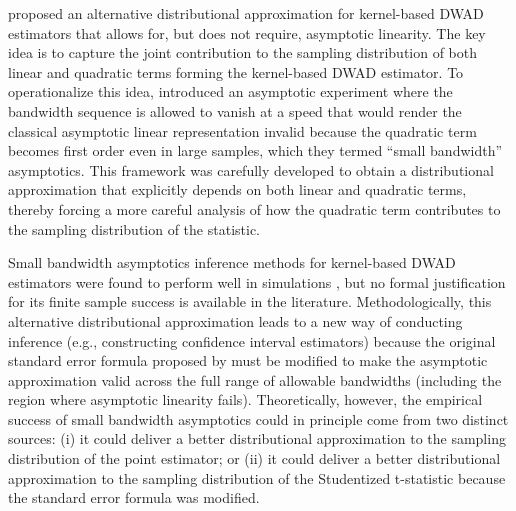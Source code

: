 \documentclass[11pt]{article}
\numberwithin{equation}{section}
\theoremstyle{definition}
\begin{document}
\citet{Cattaneo-Crump-Jansson_2014a_ET} proposed an alternative distributional approximation for kernel-based DWAD estimators that allows for, but does not require, asymptotic linearity. The key idea is to capture the joint contribution to the sampling distribution of both linear and quadratic terms forming the kernel-based DWAD estimator. To operationalize this idea, \citet{Cattaneo-Crump-Jansson_2014a_ET} introduced an asymptotic experiment where the bandwidth sequence is allowed to vanish at a speed that would render the classical asymptotic linear representation invalid because the quadratic term becomes first order even in large samples, which they termed ``small bandwidth'' asymptotics. This framework was carefully developed to obtain a distributional approximation that explicitly depends on both linear and quadratic terms, thereby forcing a more careful analysis of how the quadratic term contributes to the sampling distribution of the statistic.

Small bandwidth asymptotics inference methods for kernel-based DWAD estimators were found to perform well in simulations \citep{Cattaneo-Crump-Jansson_2010_JASA,Cattaneo-Crump-Jansson_2014a_ET,Cattaneo-Crump-Jansson_2014b_ET}, but no formal justification for its finite sample success is available in the literature. Methodologically, this alternative distributional approximation leads to a new way of conducting inference (e.g., constructing confidence interval estimators) because the original standard error formula proposed by \citet{Powell-Stock-Stoker_1989_ECMA} must be modified to make the asymptotic approximation valid across the full range of allowable bandwidths (including the region where asymptotic linearity fails). Theoretically, however, the empirical success of small bandwidth asymptotics could in principle come from two distinct sources: (i) it could deliver a better distributional approximation to the sampling distribution of the point estimator; or (ii) it could deliver a better distributional approximation to the sampling distribution of the Studentized t-statistic because the standard error formula was modified.
\end{document}
